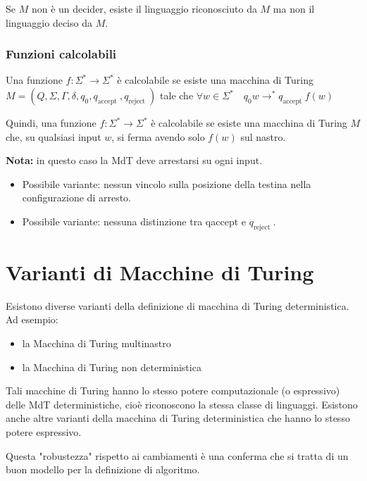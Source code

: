 Se $M$ non è un decider, esiste il linguaggio riconosciuto da $M$ ma non il linguaggio deciso da $M$.

\subsubsection{Funzioni calcolabili}

Una funzione $f: \Sigma^{*} \rightarrow \Sigma^{*}$ è calcolabile se esiste una macchina di Turing $M=\left(Q, \Sigma, \Gamma, \delta, q_{0}, q_{\text {accept }}, q_{\text {reject }}\right)$ tale che
$\forall w \in \Sigma^{*} \quad q_{0} w \rightarrow^{*} q_{\text {accept }} f(w)$

\vspace{5mm}

Quindi, una funzione $f: \Sigma^{*} \rightarrow \Sigma^{*}$ è calcolabile se esiste una macchina di Turing $M$ che, su qualsiasi input $w$, si ferma avendo solo $f(w)$ sul nastro.

\textbf{Nota:} in questo caso la MdT deve arrestarsi su ogni input.
\begin{itemize}
    \item Possibile variante: nessun vincolo sulla posizione della testina nella configurazione di arresto.
    \item Possibile variante: nessuna distinzione tra qaccept e $q_{\text {reject }}$.
\end{itemize}

\section{Varianti di Macchine di Turing}

Esistono diverse varianti della definizione di macchina di
Turing deterministica.
Ad esempio:
\begin{itemize}
    \item la Macchina di Turing multinastro
    \item la Macchina di Turing non deterministica
\end{itemize}

Tali macchine di Turing hanno lo stesso potere
computazionale (o espressivo) delle MdT deterministiche, cioè
riconoscono la stessa classe di linguaggi.
Esistono anche altre varianti della macchina di Turing
deterministica che hanno lo stesso potere espressivo.

Questa "robustezza" rispetto ai cambiamenti è una conferma
che si tratta di un buon modello per la definizione di
algoritmo.


